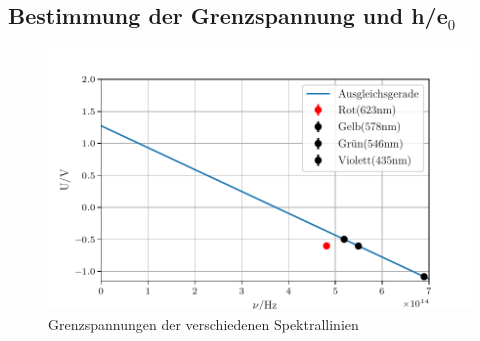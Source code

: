 \subsection{Bestimmung der Grenzspannung und h/e$_0$}

\begin{figure}[H]
  \centering
  \includegraphics{content/Grenzspannung.pdf}
  \caption{Grenzspannungen der verschiedenen Spektrallinien}
  \label{fig:Grenz}
\end{figure}